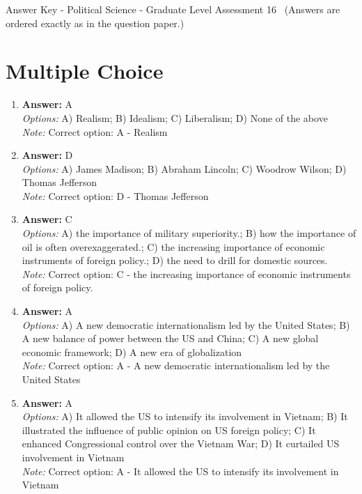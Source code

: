 \documentclass[12pt]{article}
\begin{document}
\begin{center}
Answer Key - Political Science - Graduate Level Assessment 16 \
\small (Answers are ordered exactly as in the question paper.)
\end{center}

\section*{Multiple Choice}
\begin{enumerate}[label=\arabic*.]
\item \textbf{Answer:} A
\\ \textit{Options:} A) Realism; B) Idealism; C) Liberalism; D) None of the above
\\ \textit{Note:} Correct option: A - Realism
\item \textbf{Answer:} D
\\ \textit{Options:} A) James Madison; B) Abraham Lincoln; C) Woodrow Wilson; D) Thomas Jefferson
\\ \textit{Note:} Correct option: D - Thomas Jefferson
\item \textbf{Answer:} C
\\ \textit{Options:} A) the importance of military superiority.; B) how the importance of oil is often overexaggerated.; C) the increasing importance of economic instruments of foreign policy.; D) the need to drill for domestic sources.
\\ \textit{Note:} Correct option: C - the increasing importance of economic instruments of foreign policy.
\item \textbf{Answer:} A
\\ \textit{Options:} A) A new democratic internationalism led by the United States; B) A new balance of power between the US and China; C) A new global economic framework; D) A new era of globalization
\\ \textit{Note:} Correct option: A - A new democratic internationalism led by the United States
\item \textbf{Answer:} A
\\ \textit{Options:} A) It allowed the US to intensify its involvement in Vietnam; B) It illustrated the influence of public opinion on US foreign policy; C) It enhanced Congressional control over the Vietnam War; D) It curtailed US involvement in Vietnam
\\ \textit{Note:} Correct option: A - It allowed the US to intensify its involvement in Vietnam
\end{enumerate}
\end{document}
